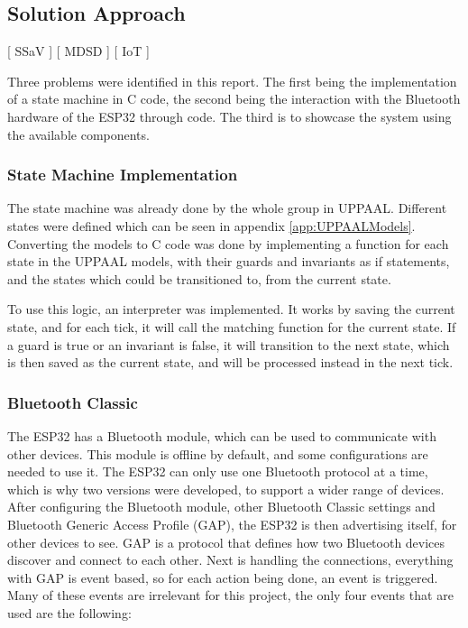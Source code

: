 \subsection{Solution Approach}
[ SSaV ] [ MDSD ] [ IoT ] 
\newline

Three problems were identified in this report.
The first being the implementation of a state machine in C code, the second being the interaction with the Bluetooth hardware of the ESP32 through code.
The third is to showcase the system using the available components.

\subsubsection{State Machine Implementation}
The state machine was already done by the whole group in UPPAAL.
Different states were defined which can be seen in appendix \ref{app:UPPAALModels}.
Converting the models to C code was done by implementing a function for each state in the UPPAAL models, with their guards and invariants as if statements, and the states which could be transitioned to, from the current state.

To use this logic, an interpreter was implemented.
It works by saving the current state, and for each tick, it will call the matching function for the current state.
If a guard is true or an invariant is false, it will transition to the next state, which is then saved as the current state, and will be processed instead in the next tick.

\subsubsection{Bluetooth Classic}
The ESP32 has a Bluetooth module, which can be used to communicate with other devices.
This module is offline by default, and some configurations are needed to use it.
The ESP32 can only use one Bluetooth protocol at a time, which is why two versions were developed, to support a wider range of devices.
After configuring the Bluetooth module, other Bluetooth Classic settings and Bluetooth Generic Access Profile (GAP), the ESP32 is then advertising itself, for other devices to see.
GAP is a protocol that defines how two Bluetooth devices discover and connect to each other.
Next is handling the connections, everything with GAP is event based, so for each action being done, an event is triggered.
Many of these events are irrelevant for this project, the only four events that are used are the following:
\newline

